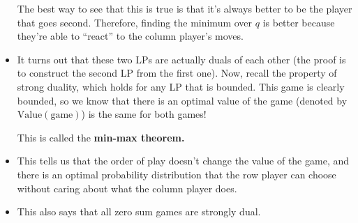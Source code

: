 \begin{itemize}

		The best way to see that this is true is that it's always better to be the player that 
		goes second. Therefore, finding the minimum over \(q\) is better because they're able to ``react'' to 
		the column player's moves.
	\item It turns out that these two LPs are actually duals of each other (the proof is to construct 
		the second LP from the first one). Now, recall the property of strong duality, which holds for any LP
		that is bounded. This game is clearly bounded, so we know that there is an optimal value of the game 
		(denoted by $\mathrm{Value}(\text{game})$) is the same for both games!  

		This is called the \textbf{min-max theorem.}
	\item This tells us that the order of play doesn't change the value of the game, and there is an optimal 
		probability distribution that the row player can choose without caring about what the column player 
		does. 
		
	\item This also says that all zero sum games are strongly dual.
\end{itemize}
